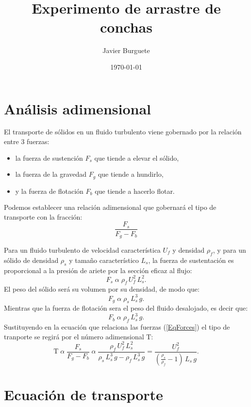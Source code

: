\documentclass[a4paper]{article}
\author{Javier Burguete}
\date{\today}
\title{Experimento de arrastre de conchas}
\begin{document}
\maketitle

\section{Análisis adimensional}

El transporte de sólidos en un fluido turbulento viene gobernado por la relación
entre 3 fuerzas:
\begin{itemize}
\item la fuerza de sustención $F_s$ que tiende a elevar el sólido,
\item la fuerza de la gravedad $F_g$ que tiende a hundirlo,
\item y la fuerza de flotación $F_b$ que tiende a hacerlo flotar.
\end{itemize}

Podemos establecer una relación adimensional que gobernará el tipo de transporte
con la fracción:
\begin{equation}\label{EqForces}
\frac{F_s}{F_g-F_b}
\end{equation}

Para un fluido turbulento de velocidad característica $U_f$ y densidad $\rho_f$,
y para un sólido de densidad $\rho_s$ y tamaño característico $L_s$, la fuerza
de sustentación es proporcional a la presión de ariete por la sección eficaz al
flujo:
\begin{equation}
F_s\;\alpha\;\rho_f\,U_f^2\,L_s^2.
\end{equation}
El peso del sólido será su volumen por su densidad, de modo que:
\begin{equation}
F_g\;\alpha\;\rho_s\,L_s^3\,g.
\end{equation}
Mientras que la fuerza de flotación sera el peso del fluido desalojado, es
decir que:
\begin{equation}
F_b\;\alpha\;\rho_f\,L_s^3\,g.
\end{equation}
Sustituyendo en la ecuación que relaciona las fuerzas (\ref{EqForces}) el tipo
de tranporte se regirá por el número adimensional T:
\begin{equation}
\mathrm{T}\;\alpha\;\frac{F_s}{F_g-F_b}
\;\alpha\;\frac{\rho_f\,U_f^2\,L_s^2}{\rho_s\,L_s^3\,g-\rho_f\,L_s^3\,g}
=\frac{U_f^2}{\left(\frac{\rho_s}{\rho_f}-1\right)\,L_s\,g}.
\end{equation}

\section{Ecuación de transporte}
\end{document}

